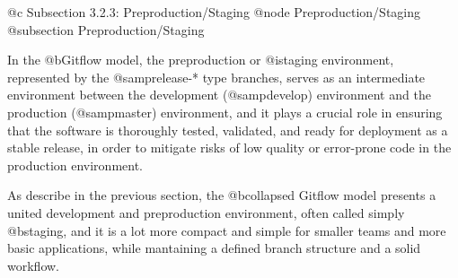 @c Subsection 3.2.3: Preproduction/Staging
@node Preproduction/Staging
@subsection Preproduction/Staging

In the @b{Gitflow} model, the preproduction or @i{staging} environment, represented by the @samp{release-*} type branches, serves as an intermediate environment between the development (@samp{develop}) environment and the production (@samp{master}) environment, and it plays a crucial role in ensuring that the software is thoroughly tested, validated, and ready for deployment as a stable release, in order to mitigate risks of low quality or error-prone code in the production environment.

As describe in the previous section, the @b{collapsed Gitflow} model presents a united development and preproduction environment, often called simply @b{staging}, and it is a lot more compact and simple for smaller teams and more basic applications, while mantaining a defined branch structure and a solid workflow.
